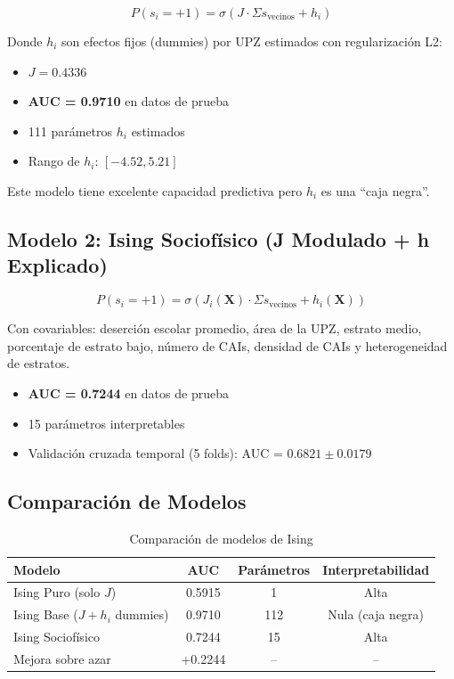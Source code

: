 \documentclass[12pt,a4paper]{article}
\begin{document}
\begin{equation}
P(s_i=+1) = \sigma(J \cdot \Sigma s_{\text{vecinos}} + h_i)
\end{equation}

Donde $h_i$ son efectos fijos (dummies) por UPZ estimados con regularización L2:
\begin{itemize}
    \item $J = 0.4336$
    \item \textbf{AUC = 0.9710} en datos de prueba
    \item 111 parámetros $h_i$ estimados
    \item Rango de $h_i$: $[-4.52, 5.21]$
\end{itemize}

Este modelo tiene excelente capacidad predictiva pero $h_i$ es una ``caja negra''.

\subsection{Modelo 2: Ising Sociofísico (J Modulado + h Explicado)}

\begin{equation}
P(s_i=+1) = \sigma\left(J_i(\mathbf{X}) \cdot \Sigma s_{\text{vecinos}} + h_i(\mathbf{X})\right)
\end{equation}

Con covariables: deserción escolar promedio, área de la UPZ, estrato medio, porcentaje de estrato bajo, número de CAIs, densidad de CAIs y heterogeneidad de estratos.
\begin{itemize}
    \item \textbf{AUC = 0.7244} en datos de prueba
    \item 15 parámetros interpretables
    \item Validación cruzada temporal (5 folds): AUC = $0.6821 \pm 0.0179$
\end{itemize}

\subsection{Comparación de Modelos}

\begin{table}[H]
\centering
\caption{Comparación de modelos de Ising}
\label{tab:comparacion}
\begin{tabular}{@{}lccc@{}}
\toprule
\textbf{Modelo} & \textbf{AUC} & \textbf{Parámetros} & \textbf{Interpretabilidad} \\
\midrule
Ising Puro (solo $J$) & 0.5915 & 1 & Alta \\
Ising Base ($J + h_i$ dummies) & 0.9710 & 112 & Nula (caja negra) \\
Ising Sociofísico & 0.7244 & 15 & Alta \\
\rowcolor{yellow!20}
Mejora sobre azar & +0.2244 & -- & -- \\
\bottomrule
\end{tabular}
\end{table}
\end{document}
